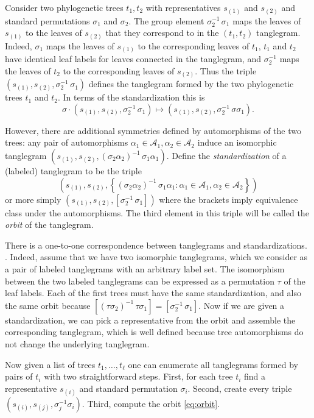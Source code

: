\documentclass{amsart}
\newcommand{\aut}{\mathcal A}
\begin{document}
Consider two phylogenetic trees $t_1, t_2$ with representatives $s_{(1)}$ and $s_{(2)}$ and standard permutations $\sigma_1$ and $\sigma_2$.
The group element $\sigma_2^{-1} \, \sigma_1$ maps the leaves of $s_{(1)}$ to the leaves of $s_{(2)}$ that they correspond to in the $(t_1, t_2)$ tanglegram.
Indeed, $\sigma_1$ maps the leaves of $s_{(1)}$ to the corresponding leaves of $t_1$, $t_1$ and $t_2$ have identical leaf labels for leaves connected in the tanglegram, and $\sigma_2^{-1}$ maps the leaves of $t_2$ to the corresponding leaves of $s_{(2)}$.
Thus the triple $(s_{(1)}, s_{(2)}, \sigma_2^{-1} \, \sigma_1)$ defines the tanglegram formed by the two phylogenetic trees $t_1$ and $t_2$.
In terms of the standardization this is
\[
\sigma \cdot (s_{(1)}, s_{(2)}, \sigma_2^{-1} \, \sigma_1) \mapsto (s_{(1)}, s_{(2)}, \sigma_2^{-1} \, \sigma \sigma_1).
\]



However, there are additional symmetries defined by automorphisms of the two trees: any pair of automorphisms $\alpha_1 \in \aut_1, \alpha_2 \in \aut_2$ induce an isomorphic tanglegram $(s_{(1)}, s_{(2)}, \left(\sigma_2 \alpha_2 \right)^{-1} \, \sigma_1 \alpha_1)$.
Define the \emph{standardization} of a (labeled) tanglegram to be the triple
\begin{equation}
\label{eq:orbit}
\left(s_{(1)}, s_{(2)}, \left\{(\sigma_2 \alpha_2)^{-1} \, \sigma_1 \alpha_1 : \alpha_1 \in \aut_1, \alpha_2 \in \aut_2  \right\}\right)
\end{equation}
or more simply $(s_{(1)}, s_{(2)}, [\sigma_2^{-1} \, \sigma_1])$ where the brackets imply equivalence class under the automorphisms.
The third element in this triple will be called the \emph{orbit} of the tanglegram.

There is a one-to-one correspondence between tanglegrams and standardizations.
.
Indeed, assume that we have two isomorphic tanglegrams, which we consider as a pair of labeled tanglegrams with an arbitrary label set.
The isomorphism between the two labeled tanglegrams can be expressed as a permutation $\tau$ of the leaf labels.
Each of the first trees must have the same standardization, and also the same orbit because $[\left(\tau \sigma_2\right)^{-1} \, \tau \sigma_1] = [\sigma_2^{-1} \, \sigma_1]$.
Now if we are given a standardization, we can pick a representative from the orbit and assemble the corresponding tanglegram, which is well defined because tree automorphisms do not change the underlying tanglegram.

Now given a list of trees $t_1, \ldots, t_\ell$ one can enumerate all tanglegrams formed by pairs of $t_i$ with two straightforward steps.
First, for each tree $t_i$ find a representative $s_{(i)}$ and standard permutation $\sigma_i$.
Second, create every triple $(s_{(i)}, s_{(j)}, \sigma_j^{-1} \sigma_i)$.
Third, compute the orbit \eqref{eq:orbit}.
\end{document}
